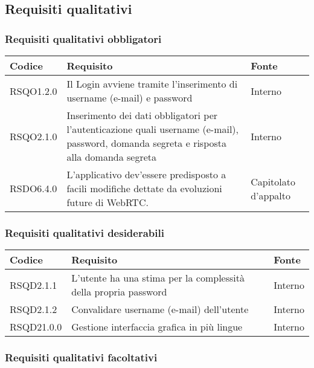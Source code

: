 \subsection{Requisiti qualitativi}

\subsubsection{Requisiti qualitativi obbligatori}

\begin{center}
\begin{longtable}{lp{}l}
\toprule Codice & Requisito & Fonte\\
\midrule
RSQO1.2.0 & Il Login avviene tramite l'inserimento di username (e-mail) e password & Interno \\
RSQO2.1.0 & Inserimento dei dati obbligatori per l'autenticazione quali username (e-mail), password, domanda segreta e risposta alla domanda segreta & Interno \\
RSDO6.4.0 & L'applicativo dev'essere predisposto a facili modifiche dettate da evoluzioni future di WebRTC. & Capitolato d'appalto \\
\bottomrule
\end{longtable}
\end{center}

\subsubsection{Requisiti qualitativi desiderabili}

\begin{center}
\begin{longtable}{lp{}l}
\toprule Codice & Requisito & Fonte\\
\midrule
RSQD2.1.1 & L'utente ha una stima per la complessità della propria password & Interno \\
RSQD2.1.2 & Convalidare username (e-mail) dell'utente & Interno \\
RSQD21.0.0 & Gestione interfaccia grafica in più lingue & Interno \\
\bottomrule
\end{longtable}
\end{center}

\subsubsection{Requisiti qualitativi facoltativi}

